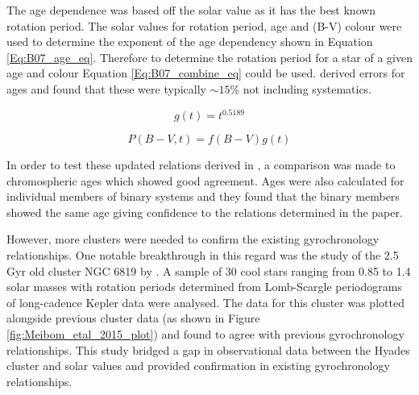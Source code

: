 The age dependence was based off the solar value as it has the best known rotation period. The solar values for rotation period, age and (B-V) colour were used to determine the exponent of the age dependency shown in Equation \ref{Eq:B07_age_eq}. Therefore to determine the rotation period for a star of a given age and colour Equation \ref{Eq:B07_combine_eq} could be used. \citet{Barnes_2007} derived errors for ages and found that these were typically $\sim 15$\% not including systematics.

\begin{equation}
   g(t) = t^{0.5189}
    \label{Eq:B07_age_eq}
\end{equation}

\begin{equation}
    P(B-V, t) = f(B-V)g(t)
    \label{Eq:B07_combine_eq}
\end{equation}

In order to test these updated relations derived in \citet{Barnes_2007}, a comparison was made to chromospheric ages which showed good agreement. Ages were also calculated for individual members of binary systems and they found that the binary members showed the same age giving confidence to the relations determined in the paper.

However, more clusters were needed to confirm the existing gyrochronology relationships. One notable breakthrough in this regard was the study of the 2.5 Gyr old cluster NGC 6819 by \citet{Meibom_etal_2015}. A sample of 30 cool stars ranging from 0.85 to 1.4 solar masses with rotation periods determined from Lomb-Scargle periodograms of long-cadence Kepler data were analysed. The data for this cluster was plotted alongside previous cluster data (as shown in Figure \ref{fig:Meibom_etal_2015_plot}) and found to agree with previous gyrochronology relationships. This study bridged a gap in observational data between the Hyades cluster and solar values and provided confirmation in existing gyrochronology relationships.

